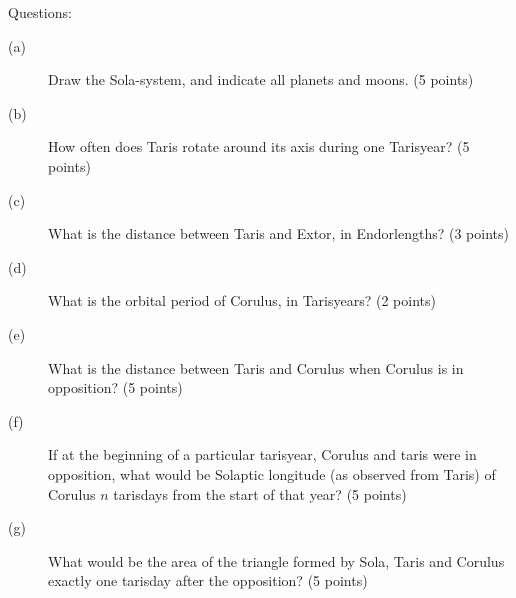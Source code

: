 Questions:
\begin{description}
\item[(a)] Draw the Sola-system, and indicate all planets and moons.
  \hfill(5 points)
\item[(b)] How often does Taris rotate around its axis during one Tarisyear?
  \hfill(5 points)
\item[(c)] What is the distance between Taris and Extor, in Endorlengths?
  \hfill(3 points)
\item[(d)] What is the orbital period of Corulus, in Tarisyears?
  \hfill(2 points)
\item[(e)] What is the distance between Taris and Corulus when Corulus is in
  opposition? \hfill(5 points)
\item[(f)] If at the beginning of a particular tarisyear, Corulus and taris
  were in opposition, what would be Solaptic longitude (as observed from Taris)
  of Corulus $n$ tarisdays from the start of that year? \hfill(5 points)
\item[(g)] What would be the area of the triangle formed by Sola, Taris and
  Corulus exactly one tarisday after the opposition? \hfill(5 points)
\end{description}
